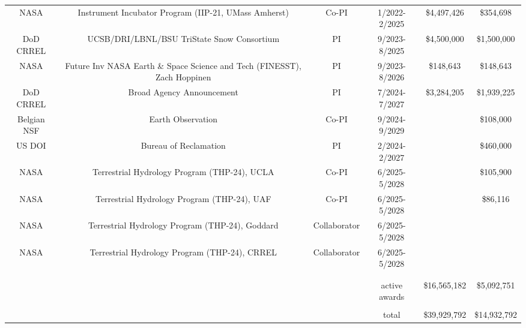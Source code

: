 \documentclass[11pt]{article}
\begin{document}
\begin{table}[!htbp]
\begin{tabular}{cccccc}
NASA             & Instrument Incubator Program (IIP-21, UMass Amherst)       & Co-PI & 1/2022-2/2025    & \$4,497,426  & \$354,698  \\
DoD CRREL        & UCSB/DRI/LBNL/BSU TriState Snow Consortium                              & PI    & 9/2023-8/2025    & \$4,500,000  & \$1,500,000  \\
NASA             & Future Inv NASA Earth \& Space Science and Tech (FINESST), Zach Hoppinen & PI    & 9/2023-8/2026    & \$148,643    & \$148,643   \\
DoD CRREL & Broad Agency Announcement & PI & 7/2024-7/2027 & \$3,284,205 & \$1,939,225 \\
Belgian NSF & Earth Observation & Co-PI & 9/2024-9/2029 & & \$108,000 \\
US DOI & Bureau of Reclamation & PI & 2/2024-2/2027 & & \$460,000 \\
NASA & Terrestrial Hydrology Program (THP-24), UCLA & Co-PI & 6/2025-5/2028 & & \$105,900 \\  
NASA & Terrestrial Hydrology Program (THP-24), UAF & Co-PI & 6/2025-5/2028 & & \$86,116 \\  
NASA & Terrestrial Hydrology Program (THP-24), Goddard & Collaborator & 6/2025-5/2028 & & \\  
NASA & Terrestrial Hydrology Program (THP-24), CRREL & Collaborator & 6/2025-5/2028 & & \\  
                 &                                                                         &       &                  &             &   \\
                 &                                                                         &       &                  &             &    \\
                 &                                                                         &       & active awards    & \$16,565,182 & \$5,092,751  \\
                 &                                                                         &       &                  &             &   \\
                 &                                                                         &       & total            & \$39,929,792 & \$14,932,792  \\
\end{tabular}
\end{table}

\clearpage
\end{document}
